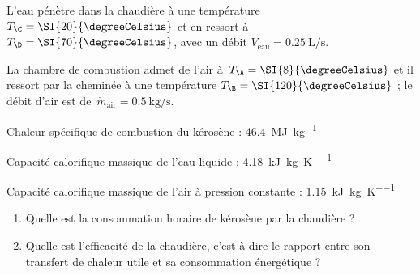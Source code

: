 	L’eau pénètre dans la chaudière à une température $T_\C = \SI{20}{\degreeCelsius}$ et en ressort à $T_\D = \SI{70}{\degreeCelsius}$, avec un débit $\dot V_{\text{eau}} = \SI{0,25}{\liter\per\second}$.
	
	La chambre de combustion admet de l’air à~$T_\A = \SI{8}{\degreeCelsius}$ et il ressort par la cheminée à une température $T_\B = \SI{120}{\degreeCelsius}$ ; le débit d’air est de~$\dot m_{\text{air}} = \SI{0,5}{\kilogram\per\second}$.
	
	Chaleur spécifique de combustion du kérosène : 			\SI{46,4}{\mega\joule\per\kilogram}
	
	Capacité calorifique massique de l’eau liquide : 		\SI{4,18}{\kilo\joule\per\kilogram\per\kelvin}
	
	Capacité calorifique massique de l’air à pression constante : 	\SI{1,15}{\kilo\joule\per\kilogram\per\kelvin}

	\begin{enumerate}
	\item Quelle est la consommation horaire de kérosène par la chaudière ?
	\item Quelle est l’efficacité de la chaudière, c’est à dire le rapport entre son transfert de chaleur utile et sa consommation énergétique ?
	\end{enumerate}

